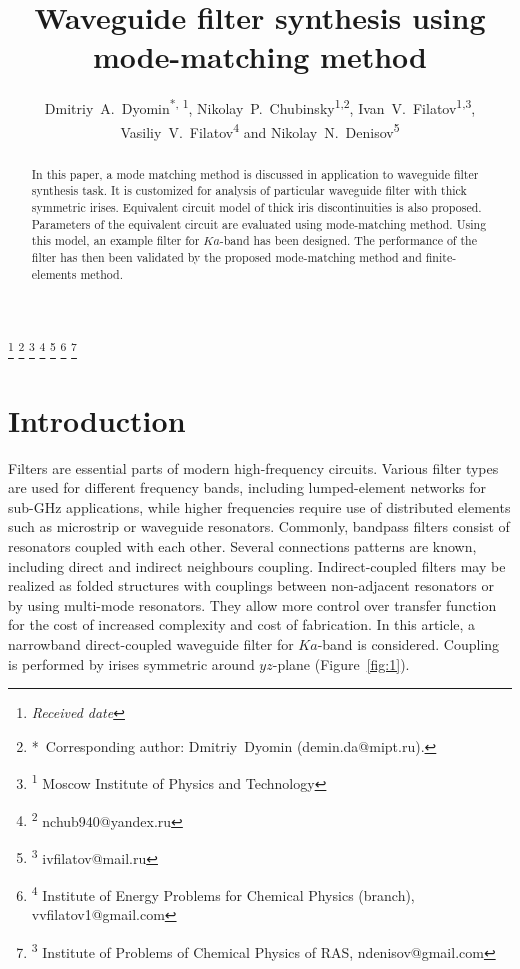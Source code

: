 \documentclass{pj}
\begin{document}
\setcounter{page}{1}

\title%
[Waveguide filter synthesis using mode-matching method]%
{Waveguide filter synthesis using mode-matching method}

\author{
  Dmitriy~A.~Dyomin\textsuperscript{*, 1},
  Nikolay~P.~Chubinsky\textsuperscript{1,2},
  Ivan~V.~Filatov\textsuperscript{1,3},
  Vasiliy~V.~Filatov\textsuperscript{4} and
  Nikolay~N.~Denisov\textsuperscript{5}
}

\footnote{\it Received date}
\setcounter{footnote}{0}
\footnote{\hskip-0.12in*\,
  Corresponding author: Dmitriy~Dyomin (demin.da@mipt.ru).}
\setcounter{footnote}{0}
\footnote{\hskip-0.12in\textsuperscript{1}
  Moscow Institute of Physics and Technology}
\setcounter{footnote}{0}
\footnote{\hskip-0.12in\textsuperscript{2}
  nchub940@yandex.ru}
\setcounter{footnote}{0}
\footnote{\hskip-0.12in\textsuperscript{3}
  ivfilatov@mail.ru}
\setcounter{footnote}{0}
\footnote{\hskip-0.12in\textsuperscript{4}
  Institute of Energy Problems for Chemical Physics (branch),
  vvfilatov1@gmail.com}
\setcounter{footnote}{0}
\footnote{\hskip-0.12in\textsuperscript{3} Institute of Problems of
  Chemical Physics of RAS, ndenisov@gmail.com}
\setcounter{footnote}{0}


\begin{abstract}
  In this paper, a mode matching method is discussed in application to
  waveguide filter synthesis task. It is customized for analysis of
  particular waveguide filter with thick symmetric irises. Equivalent
  circuit model of thick iris discontinuities is also
  proposed. Parameters of the equivalent circuit are evaluated using
  mode-matching method. Using this model, an example filter for
  $Ka$-band has been designed. The performance of the filter has then
  been validated by the proposed mode-matching method and
  finite-elements method.
\end{abstract}

\section{Introduction}
\label{sec:introduction}

Filters are essential parts of modern high-frequency circuits.
Various filter types are used for different frequency bands, including
lumped-element networks for sub-GHz applications, while higher
frequencies require use of distributed elements such as microstrip or
waveguide resonators. Commonly, bandpass filters consist of resonators
coupled with each other. Several connections patterns are known,
including direct and indirect neighbours coupling. Indirect-coupled
filters may be realized as folded structures with couplings between
non-adjacent resonators or by using multi-mode resonators. They allow
more control over transfer function for the cost of increased
complexity and cost of fabrication. In this article, a narrowband
direct-coupled waveguide filter for $Ka$-band is considered. Coupling
is performed by irises symmetric around $yz$-plane
(Figure~\ref{fig:1}).
\end{document}
